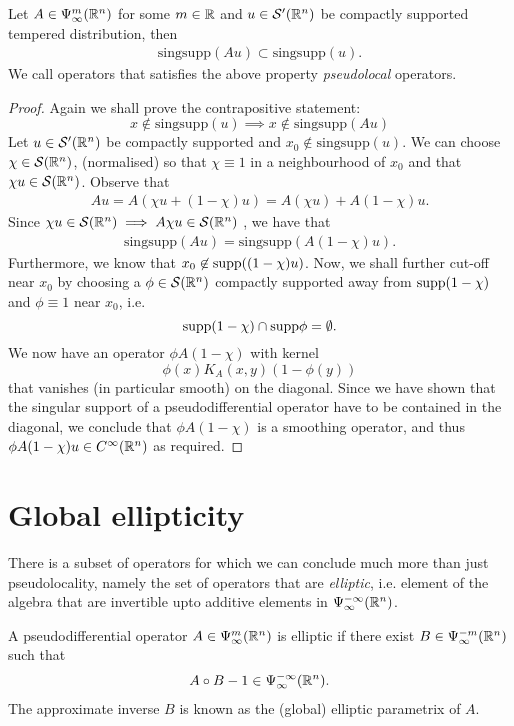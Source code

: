 \documentclass[12pt]{article}
\begin{document}
\begin{fprop}
    Let $A \in \Psi^m_\infty({\mathbb R}^n)$ for some $m \in {\ensuremath {\mathbb R}}$ and $u \in \mathcal{S}'({\mathbb R}^n)$ be compactly supported tempered distribution, then 
    \begin{align*}
        \mathrm{sing supp}(A u) \subset \mathrm{sing supp }(u). 
    \end{align*}
    We call operators that satisfies the above property \textit{pseudolocal} operators.
\end{fprop}
\begin{proof}
    Again we shall prove the contrapositive statement: 
    \[
    x \not \in \mathrm{sing supp}(u) \implies x \not \in \mathrm{sing supp}(Au)
    \]
    Let $u \in \mathcal{S}'({\mathbb R}^n)$ be compactly supported and $x_0 \not \in \mathrm{sing supp}(u)$.  We can choose $\chi \in \mathcal{S}({\mathbb R}^n)$, (normalised) so that $\chi \equiv 1$ in a neighbourhood of $x_0$ and that $\chi u \in \mathcal{S}({\mathbb R}^n)$. Observe that 
    \begin{align*}
        Au = A(\chi u + (1 - \chi)u) = A(\chi u) + A(1 - \chi)u. 
    \end{align*}
    Since $\chi u \in \mathcal{S}({\mathbb R}^n) \implies A\chi u \in \mathcal{S}({\mathbb R}^n)$ \cite{rbm lemma 2.3}, we have that 
    \begin{align*}
        \mathrm{singsupp}(Au) = \mathrm{singsupp}(A(1 - \chi)u). 
    \end{align*}
    Furthermore, we know that $x_0 \not \in \mathrm{supp}((1 - \chi)u)$. 
    Now, we shall further cut-off near $x_0$ by choosing a $\phi \in \mathcal{S}({\mathbb R}^n)$ compactly supported  away from $\mathrm{supp}(1 - \chi)$ and $\phi \equiv 1$ near $x_0$, i.e. 
    \[
    \mathrm{supp}(1 - \chi) \cap \mathrm{supp} \phi = \emptyset. 
    \]
    We now have an operator $\phi A(1 - \chi) $ with kernel
    \[
    \phi(x) K_A(x, y) ( 1 - \phi(y))
    \]
    that vanishes (in particular smooth) on the diagonal. Since we have shown that the singular support of a pseudodifferential operator have to be contained in the diagonal, we conclude that $\phi A(1 - \chi)$ is a smoothing operator, and thus $\phi A (1 - \chi) u \in C^\infty({\mathbb R}^n)$ as required. 
    
\end{proof}


\section{Global ellipticity} 
There is a subset of operators for which we can conclude much more than just pseudolocality, namely the set of operators that are \textit{elliptic}, i.e. element of the algebra that are invertible upto additive elements in $\Psi^{-\infty}_{\infty}({\mathbb R}^n)$. 
\begin{fdefinition}
    A pseudodifferential operator $A \in \Psi^{m}_{\infty}({\mathbb R}^n)$ is elliptic if there exist $B \in \Psi^{-m}_{\infty}({\mathbb R}^n)$ such that 
    \begin{align*}
    A \circ B - 1 \in \Psi^{-\infty}_{\infty}({\mathbb R}^n). 
    \end{align*}
    The approximate inverse $B$ is known as the (global) elliptic parametrix of $A$. 
\end{fdefinition}
\end{document}
